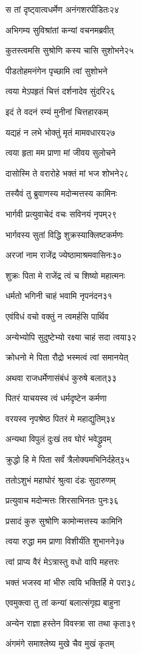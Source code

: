 स तां दृष्ट्वात्वधर्मेण अनंगशरपीडितः२४

अभिगम्य सुविश्रांतां कन्यां वचनमब्रवीत्

कुतस्त्वमसि सुश्रोणि कस्य चासि सुशोभने२५

पीडतोहमनंगेन पृच्छामि त्वां सुशोभने

त्वया मेऽपहृतं चित्तं दर्शनादेव सुंदरि२६

इदं ते वदनं रम्यं मुनीनां चित्तहारकम्

यद्यहं न लभे भोक्तुं मृतं मामवधारय२७

त्वया हृता मम प्राणा मां जीवय सुलोचने

दासोस्मि ते वरारोहे भक्तं मां भज शोभने२८

तस्यैवं तु ब्रुवाणस्य मदोन्मत्तस्य कामिनः

भार्गवी प्रत्युवाचेदं वचः सविनयं नृपम्२९

भार्गवस्य सुतां विद्धि शुक्रस्याक्लिष्टकर्मणः

अरजां नाम राजेंद्र ज्येष्ठामाश्रमवासिनः३०

शुक्रः पिता मे राजेंद्र त्वं च शिष्यो महात्मनः

धर्मतो भगिनी चाहं भवामि नृपनंदन३१

एवंविधं वचो वक्तुं न त्वमर्हसि पार्थिव

अन्येभ्योपि सुदुष्टेभ्यो रक्ष्या चाहं सदा त्वया३२

क्रोधनो मे पिता रौद्रो भस्मत्वं त्वां समानयेत्

अथवा राजधर्मेणासंबंधं कुरुषे बलात्३३

पितरं याचयस्व त्वं धर्मदृष्टेन कर्मणा

वरयस्व नृपश्रेष्ठ पितरं मे महाद्युतिम्३४

अन्यथा विपुलं दुःखं तव घोरं भवेद्ध्रुवम्

क्रुद्धो हि मे पिता सर्वं त्रैलोक्यमभिनिर्दहेत्३५

ततोऽशुभं महाघोरं श्रुत्वा दंडः सुदारुणम्

प्रत्युवाच मदोन्मत्तः शिरसाभिनतः पुनः३६

प्रसादं कुरु सुश्रोणि कामोन्मत्तस्य कामिनि

त्वया रुद्धा मम प्राणा विशीर्यंति शुभानने३७

त्वां प्राप्य वैरं मेऽत्रास्तु वधो वापि महत्तरः

भक्तं भजस्व मां भीरु त्वयि भक्तिर्हि मे परा३८

एवमुक्त्वा तु तां कन्यां बलात्संगृह्य बाहुना

अन्येन राज्ञा हस्तेन विवस्त्रा सा तथा कृता३९

अंगमंगे समाश्लेष्य मुखे चैव मुखं कृतम्

